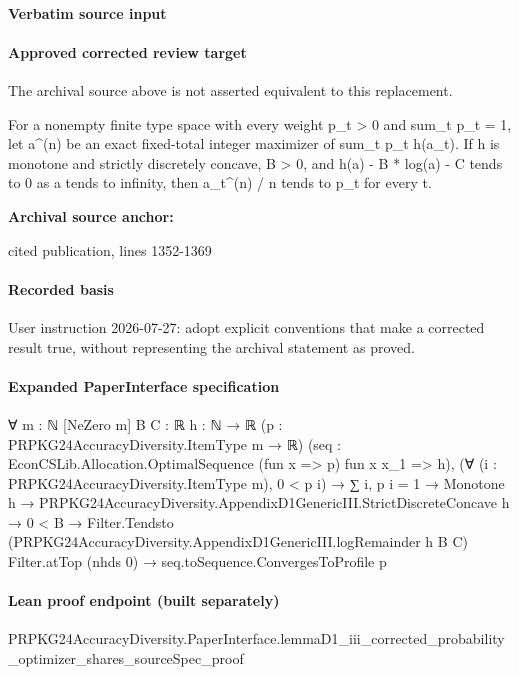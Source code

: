 \documentclass[10pt]{article}
\begin{document}
\paragraph{Verbatim source input}
\begin{ReviewVerbatim}
\end{ReviewVerbatim}

\paragraph{Approved corrected review target}
The archival source above is not asserted equivalent to this replacement.
\begin{ReviewVerbatim}
For a nonempty finite type space with every weight p_t > 0 and sum_t p_t = 1, let a^(n) be an exact fixed-total integer maximizer of sum_t p_t h(a_t). If h is monotone and strictly discretely concave, B > 0, and h(a) - B * log(a) - C tends to 0 as a tends to infinity, then a_t^(n) / n tends to p_t for every t.
\end{ReviewVerbatim}

\textbf{Archival source anchor:} {\footnotesize\raggedright cited publication, lines 1352-\allowbreak{}1369\par}
\paragraph{Recorded basis}
User instruction 2026-\allowbreak{}07-\allowbreak{}27:\allowbreak{} adopt explicit conventions that make a corrected result true, without representing the archival statement as proved.\allowbreak{}
\paragraph{Expanded PaperInterface specification}
\begin{ReviewVerbatim}
∀ {m : ℕ} [NeZero m] {B C : ℝ} {h : ℕ → ℝ} (p : PRPKG24AccuracyDiversity.ItemType m → ℝ)
  (seq : EconCSLib.Allocation.OptimalSequence (fun x => p) fun x x_1 => h),
  (∀ (i : PRPKG24AccuracyDiversity.ItemType m), 0 < p i) →
    ∑ i, p i = 1 →
      Monotone h →
        PRPKG24AccuracyDiversity.AppendixD1GenericIII.StrictDiscreteConcave h →
          0 < B →
            Filter.Tendsto (PRPKG24AccuracyDiversity.AppendixD1GenericIII.logRemainder h B C) Filter.atTop (nhds 0) →
              seq.toSequence.ConvergesToProfile p
\end{ReviewVerbatim}

\paragraph{Lean proof endpoint (built separately)}\begin{ReviewVerbatim}
PRPKG24AccuracyDiversity.PaperInterface.lemmaD1_iii_corrected_probability_optimizer_shares_sourceSpec_proof
\end{ReviewVerbatim}
\end{document}
